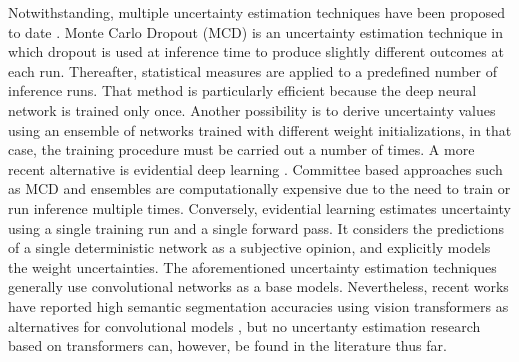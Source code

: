 Notwithstanding, multiple uncertainty estimation techniques have been proposed to date \cite{gawlikowski2021survey}. Monte Carlo Dropout (MCD) \cite{gal2016dropout} is an uncertainty estimation technique in which dropout is used at inference time to produce slightly different outcomes at each run. Thereafter, statistical measures are applied to a predefined number of inference runs. That method is particularly efficient because the deep neural network is trained only once. Another possibility is to derive uncertainty values using an ensemble of networks trained with different weight initializations, in that case, the training procedure must be carried out a number of times. A more recent alternative is evidential deep learning \cite{sensoy2018evidential}. Committee based approaches such as MCD and ensembles are computationally expensive due to the need to train or run inference multiple times. Conversely, evidential learning estimates uncertainty using a single training run and a single forward pass. It considers the predictions of a single deterministic network as a subjective opinion, and explicitly models the weight uncertainties. The aforementioned uncertainty estimation techniques generally use convolutional networks as a base models. Nevertheless, recent works have reported high semantic segmentation accuracies using vision transformers as alternatives for convolutional models \cite{ranftl2021vision,zhang2022dino}, but no uncertanty estimation research based on transformers can, however, be found in the literature thus far.





